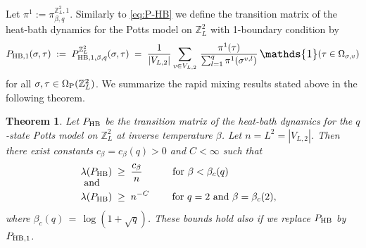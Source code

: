 \documentclass{dis}
\newtheorem{theorem}{Theorem}[chapter]
\theoremstyle{citing}
\begin{document}
Let $\pi^1:=\pi^{{\ensuremath{\mathbb{Z}}}_L^2,1}_{\beta,q}$. 
Similarly to \eqref{eq:P-HB} we define the transition matrix of the 
heat-bath dynamics for the Potts 
model on ${\ensuremath{\mathbb{Z}}}_L^2$ with 1-boundary condition by
\begin{equation}\label{eq:P-HB_boundary}
P_{{\rm HB},1}(\sigma,\tau) 
\;:=\; P_{{\rm HB},1,\beta,q}^{{\ensuremath{\mathbb{Z}}}_L^2}(\sigma,\tau) \;=\;
\frac{1}{{\left\vert {V_{L,2}} \right\vert}}\sum_{v\in V_{L,2}}\,\frac{\pi^1(\tau)}
	{\sum_{l=1}^q\pi^1(\sigma^{v,l})}\,
	{\scalebox{1.2}{\raisebox{-0.2mm}{$\mathds{1}$}}}(\tau\in{\Omega}_{\sigma,v})
\end{equation}
for all $\sigma,\tau\in{{\Omega}_{\rm P}}({\ensuremath{\mathbb{Z}}}_L^2)$.
We summarize the rapid mixing results stated above in the following 
theorem.

\begin{theorem}\label{th:P-HB_2d}
Let ${P_{\rm HB}}$ be the transition matrix of the heat-bath dynamics for 
the \mbox{$q$-state} Potts model on ${\ensuremath{\mathbb{Z}}}_L^2$ at inverse temperature $\beta$. 
Let $n=L^2={\left\vert {V_{L,2}} \right\vert}$. Then there exist constants 
$c_{\beta}=c_\beta(q)>0$ and $C<\infty$ such that
\begin{align*}
\lambda({P_{\rm HB}}) \;&\ge\; \frac{c_\beta}{n} \qquad\;\;\, 
	\text{ for } \beta < \beta_c(q) \hspace*{2cm}\\[-3mm]
\intertext{\vspace*{-1mm} and}
\lambda({P_{\rm HB}}) \;&\ge\; n^{-C} \qquad 	
	\text{ for } q=2 \text{ and } \beta = \beta_c(2),
\end{align*}
where $\beta_c(q)\,=\,\log(1+\sqrt{q})$. 
These bounds hold also if we replace ${P_{\rm HB}}$ by $P_{{\rm HB},1}$.
\end{theorem}
\end{document}
